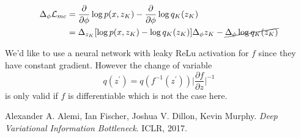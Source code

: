 \documentclass[a4paper]{article}
\begin{document}
\begin{align}
\Delta_\phi \mathcal{L}_{mc} &= \frac{\partial}{\partial \phi} \log p(x, z_K) - \frac{\partial}{\partial \phi}  \log q_K(z_K) \\
&= \Delta_{z_K}[\log p(x, z_K) - \log q_K(z_K)] \Delta_\phi z_K - \cancel{\Delta_\phi \log q_K(z_K)}
\end{align}

We'd like to use a neural network with leaky ReLu activation for $f$ since they have constant gradient. However the change of variable 
$$q(z^\prime) = q(f^{-1}(z^\prime)) \lvert \frac{\partial f}{\partial z} \rvert^{-1} $$ is only valid if $f$ is differentiable which is not the case here.




 \begin{thebibliography}{9}
Alexander A. Alemi, Ian Fischer, Joshua V. Dillon, Kevin Murphy. 
\textit{Deep Variational Information Bottleneck}. 
ICLR, 2017.
\end{thebibliography}

 
\end{document}
